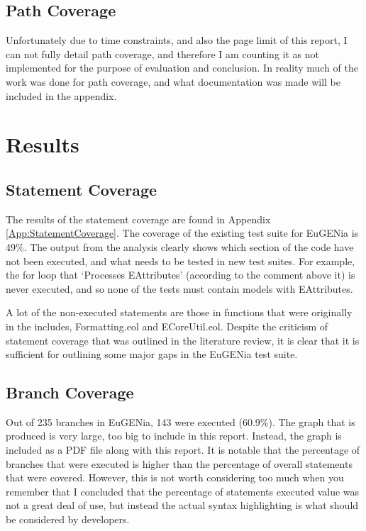 \subsection{Path Coverage}

Unfortunately due to time constraints, and also the page limit of this report, I can not fully detail path coverage, and therefore I am counting it as not implemented for the purpose of evaluation and conclusion. In reality much of the work was done for path coverage, and what documentation was made will be included in the appendix.

\section{Results}

\subsection{Statement Coverage}

The results of the statement coverage are found in Appendix \ref{App:StatementCoverage}. The coverage of the existing test suite for EuGENia is 49\%. The output from the analysis clearly shows which section of the code have not been executed, and what needs to be tested in new test suites. For example, the for loop that `Processes EAttributes' (according to the comment above it) is never executed, and so none of the tests must contain models with EAttributes.

A lot of the non-executed statements are those in functions that were originally in the includes, Formatting.eol and ECoreUtil.eol. Despite the criticism of statement coverage that was outlined in the literature review, it is clear that it is sufficient for outlining some major gaps in the EuGENia test suite.

\subsection{Branch Coverage}

Out of 235 branches in EuGENia, 143 were executed (60.9\%). The graph that is produced is very large, too big to include in this report. Instead, the graph is included as a PDF file along with this report. It is notable that the percentage of branches that were executed is higher than the percentage of overall statements that were covered. However, this is not worth considering too much when you remember that I concluded that the percentage of statements executed value was not a great deal of use, but instead the actual syntax highlighting is what should be considered by developers.

